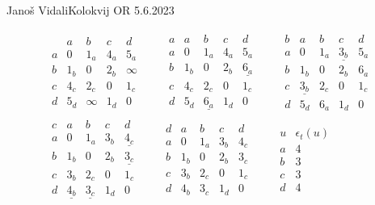 \begin{naloga}{Janoš Vidali}{Kolokvij OR 5.6.2023}
\begin{odgovor}
\begin{tabela}
$$
\begin{gathered}
\begin{array}{c|cccc}
  & a & b & c & d \\ \hline
a & 0 & 1_a & 4_a & 5_a \\
b & 1_b & 0 & 2_b & \infty \\
c & 4_c & 2_c & 0 & 1_c \\
d & 5_d & \infty & 1_d & 0
\end{array}
\qquad
\begin{array}{c|cccc}
a & a & b & c & d \\ \hline
a & 0 & 1_a & 4_a & 5_a \\
b & 1_b & 0 & 2_b & \underline{6_a} \\
c & 4_c & 2_c & 0 & 1_c \\
d & 5_d & \underline{6_a} & 1_d & 0
\end{array}
\qquad
\begin{array}{c|cccc}
b & a & b & c & d \\ \hline
a & 0 & 1_a & \underline{3_b} & 5_a \\
b & 1_b & 0 & 2_b & 6_a \\
c & \underline{3_b} & 2_c & 0 & 1_c \\
d & 5_d & 6_a & 1_d & 0
\end{array}
\\
\begin{array}{c|cccc}
c & a & b & c & d \\ \hline
a & 0 & 1_a & 3_b & \underline{4_c} \\
b & 1_b & 0 & 2_b & \underline{3_c} \\
c & 3_b & 2_c & 0 & 1_c \\
d & \underline{4_b} & \underline{3_c} & 1_d & 0
\end{array}
\qquad
\begin{array}{c|cccc}
d & a & b & c & d \\ \hline
a & 0 & 1_a & 3_b & 4_c \\
b & 1_b & 0 & 2_b & 3_c \\
c & 3_b & 2_c & 0 & 1_c \\
d & 4_b & 3_c & 1_d & 0
\end{array}
\qquad
\begin{array}{c|c}
u & \epsilon_t(u) \\ \hline
a & 4 \\
b & 3 \\
c & 3 \\
d & 4
\end{array}
\end{gathered}
$$
\end{tabela}
\end{odgovor}
\end{naloga}
